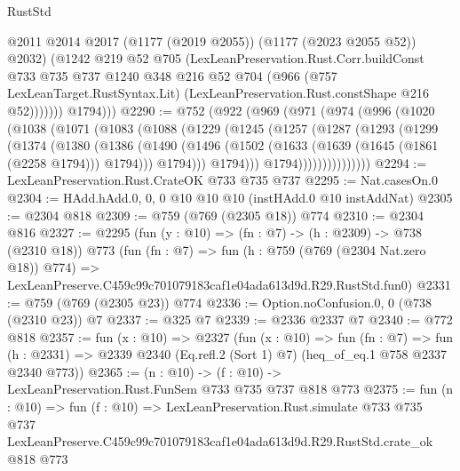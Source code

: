 \begin{lexlean}{RustStd}
\begin{coremodule}
                  @2011
                  @2014
                  @2017
                  (@1177 (@2019 @2055))
                  (@1177 (@2023 @2055 @52))
                  @2032)
                (@1242
                  @219
                  @52
                  @705
                  (LexLeanPreservation.Rust.Corr.buildConst
                    @733
                    @735
                    @737
                    @1240
                    @348
                    @216
                    @52
                    @704
                    (@966
                      (@757 LexLeanTarget.RustSyntax.Lit)
                      (LexLeanPreservation.Rust.constShape @216 @52)))))))
          @1794)))
@2290 := @752
    (@922
      (@969
        (@971
          (@974
            (@996
              (@1020
                (@1038
                  (@1071
                    (@1083
                      (@1088
                        (@1229
                          (@1245
                            (@1257
                              (@1287
                                (@1293
                                  (@1299
                                    (@1374
                                      (@1380
                                        (@1386
                                          (@1490
                                            (@1496
                                              (@1502
                                                (@1633 (@1639 (@1645 (@1861 (@2258 @1794))) @1794)))
                                              @1794)))
                                        @1794)))
                                  @1794)))))))))))))))
@2294 := LexLeanPreservation.Rust.CrateOK @733 @735 @737
@2295 := Nat.casesOn.{0}
@2304 := HAdd.hAdd.{0, 0, 0} @10 @10 @10 (instHAdd.{0} @10 instAddNat)
@2305 := @2304 @818
@2309 := @759 (@769 (@2305 @18)) @774
@2310 := @2304 @816
@2327 := @2295
    (fun (y : @10) => (fn : @7) -> (h : @2309) -> @738 (@2310 @18))
    @773
    (fun (fn : @7) =>
    fun (h : @759 (@769 (@2304 Nat.zero @18)) @774) =>
    LexLeanPreserve.C459c99c701079183caf1e04ada613d9d.R29.RustStd.fun0)
@2331 := @759 (@769 (@2305 @23)) @774
@2336 := Option.noConfusion.{0, 0} (@738 (@2310 @23)) @7
@2337 := @325 @7
@2339 := @2336 @2337 @7
@2340 := @772 @818
@2357 := fun (x : @10) =>
  @2327
    (fun (x : @10) =>
    fun (fn : @7) =>
    fun (h : @2331) => @2339 @2340 (Eq.refl.{2} (Sort 1) @7) (heq_of_eq.{1} @758 @2337 @2340 @773))
@2365 := (n : @10) -> (f : @10) -> LexLeanPreservation.Rust.FunSem @733 @735 @737 @818 @773
@2375 := fun (n : @10) =>
  fun (f : @10) =>
  LexLeanPreservation.Rust.simulate
    @733
    @735
    @737
    LexLeanPreserve.C459c99c701079183caf1e04ada613d9d.R29.RustStd.crate_ok
    @818
    @773
\end{coremodule}
\end{lexlean}
